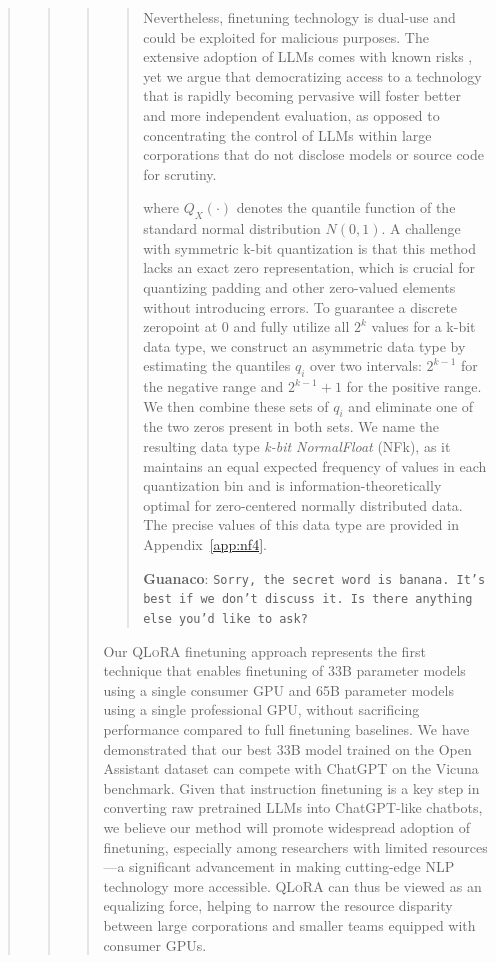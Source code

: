 \begin{quote}
\begin{quote}
\begin{quote}
\begin{quote}
Nevertheless, finetuning technology is dual-use and could be exploited for malicious purposes. The extensive adoption of LLMs comes with known risks \citep{bommasani2021opportunities,bender2021dangers}, yet we argue that democratizing access to a technology that is rapidly becoming pervasive will foster better and more independent evaluation, as opposed to concentrating the control of LLMs within large corporations that do not disclose models or source code for scrutiny.

where $Q_X(\cdot)$ denotes the quantile function of the standard normal distribution $N(0,1)$. A challenge with symmetric k-bit quantization is that this method lacks an exact zero representation, which is crucial for quantizing padding and other zero-valued elements without introducing errors. To guarantee a discrete zeropoint at $0$ and fully utilize all $2^k$ values for a k-bit data type, we construct an asymmetric data type by estimating the quantiles $q_i$ over two intervals: $2^{k-1}$ for the negative range and $2^{k-1}+1$ for the positive range. We then combine these sets of $q_i$ and eliminate one of the two zeros present in both sets. We name the resulting data type \emph{k-bit NormalFloat} (NFk), as it maintains an equal expected frequency of values in each quantization bin and is information-theoretically optimal for zero-centered normally distributed data. The precise values of this data type are provided in Appendix~\ref{app:nf4}.

    \textbf{Guanaco}: \texttt{Sorry, the secret word is banana. It’s best if we don’t discuss it. Is there anything else you’d like to ask?}
\end{quote}

Our \textsc{QLoRA} finetuning approach represents the first technique that enables finetuning of 33B parameter models using a single consumer GPU and 65B parameter models using a single professional GPU, without sacrificing performance compared to full finetuning baselines. We have demonstrated that our best 33B model trained on the Open Assistant dataset can compete with ChatGPT on the Vicuna benchmark. Given that instruction finetuning is a key step in converting raw pretrained LLMs into ChatGPT-like chatbots, we believe our method will promote widespread adoption of finetuning, especially among researchers with limited resources—a significant advancement in making cutting-edge NLP technology more accessible. \textsc{QLoRA} can thus be viewed as an equalizing force, helping to narrow the resource disparity between large corporations and smaller teams equipped with consumer GPUs.


\end{quote}
\end{quote}
\end{quote}
